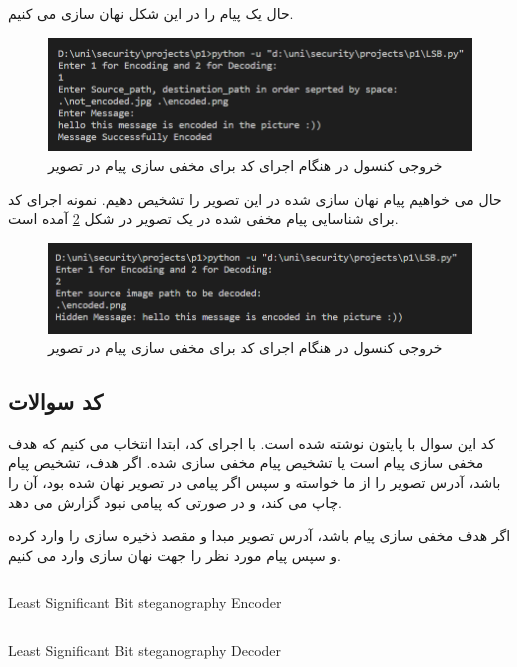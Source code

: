 حال یک پیام را در این شکل نهان سازی می کنیم.

\begin{figure}[h!]
    \centering
    \includegraphics[width=0.5\linewidth]{images/LSB_encode.png}
    \caption{خروجی کنسول در هنگام اجرای کد برای مخفی سازی پیام در تصویر}
    \label{fig:encoded}
\end{figure}

حال می خواهیم پیام نهان سازی شده در این تصویر را تشخیص دهیم.
نمونه اجرای کد برای شناسایی پیام مخفی شده در یک تصویر در شکل
 \ref{fig:LSBDecode}
آمده است.

\begin{figure}[h!]
    \centering
    \includegraphics[width=0.5\linewidth]{images/LSB_Decode.png}
    \caption{خروجی کنسول در هنگام اجرای کد برای مخفی سازی پیام در تصویر}
    \label{fig:LSBDecode}
\end{figure}



\subsection{کد سوالات}

کد این سوال با پایتون نوشته شده است. با اجرای کد، ابتدا انتخاب می کنیم که هدف مخفی سازی پیام است یا تشخیص پیام مخفی سازی شده. اگر هدف، تشخیص پیام باشد، آدرس تصویر را از ما خواسته و سپس اگر پیامی در تصویر نهان شده بود، آن را چاپ می کند، و در صورتی که پیامی نبود گزارش می دهد.

اگر هدف مخفی سازی پیام باشد، آدرس تصویر مبدا و مقصد ذخیره سازی را وارد کرده و سپس پیام مورد نظر را جهت نهان سازی وارد می کنیم.

\begin{latin}
\begin{listing}[ht]
    \inputminted{python}{sources/Encode.py}
    \caption{Least Significant Bit steganography Encoder}
    \label{listing:}
\end{listing}
\end{latin}
\begin{latin}
\begin{listing}[ht]
    \inputminted{python}{sources/Decode.py}
    \caption{Least Significant Bit steganography Decoder}
    \label{listing:}
\end{listing}
\end{latin}



